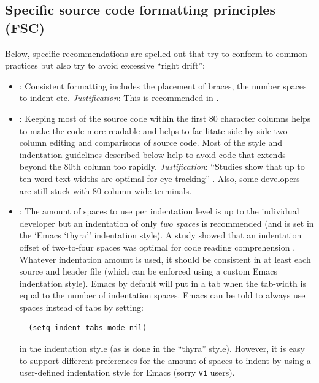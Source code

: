%
\subsection{Specific source code formatting principles (FSC)}
%

Below, specific recommendations are spelled out that try to conform to common
practices but also try to avoid excessive ``right drift'':

\begin{itemize}

{}\item\FSCConsistentInFile: Consistent formatting includes the placement of
braces, the number spaces to indent etc.  {}\textit{Justification}: This is
recommended in {}\cite[Item 0]{C++CodingStandards05}.

{}\item\FSCEightyCharWide: Keeping most of the source code within the first 80
character columns helps to make the code more readable and helps to facilitate
side-by-side two-column editing and comparisons of source code.  Most of the
style and indentation guidelines described below help to avoid code that
extends beyond the 80th column too rapidly. {}\textit{Justification}:
``Studies show that up to ten-word text widths are optimal for eye tracking''
{}\cite[Item 0]{C++CodingStandards05}.  Also, some developers are still stuck
with 80 column wide terminals.

{}\item\FSCIndentSpaces: The amount of spaces to use per indentation level is
up to the individual developer but an indentation of only {}\textit{two
spaces} is recommended (and is set in the `Emacs `thyra'' indentation style).
A study showed that an indentation offset of two-to-four spaces was optimal
for code reading comprehension {}\cite[Section 31.2]{CodeComplete2nd04}.
Whatever indentation amount is used, it should be consistent in at least each
source and header file {}\cite[Item 0]{C++CodingStandards05} (which can be
enforced using a custom Emacs indentation style).  Emacs by default will put
in a tab when the tab-width is equal to the number of indentation spaces.
Emacs can be told to always use spaces instead of tabs by setting:

{\small\begin{verbatim}
  (setq indent-tabs-mode nil)
\end{verbatim}}

in the indentation style (as is done in the ``thyra'' style).  However, it is
easy to support different preferences for the amount of spaces to indent by
using a user-defined indentation style for Emacs (sorry {}\texttt{vi} users).


\end{itemize}
